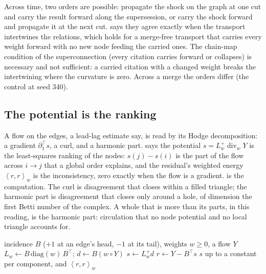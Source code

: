 \documentclass[11pt,a4paper]{article}
\theoremstyle{plain}
\theoremstyle{definition}
\theoremstyle{remark}
\newcommand{\ip}[2]{\left\langle #1, #2 \right\rangle}
\DeclareMathOperator{\divw}{div}
\begin{document}
Across time, two orders are possible: propagate the shock on the graph at one cut and carry the
result forward along the supersession, or carry the shock forward and propagate it at the next
cut.  says they agree exactly when the transport intertwines the relations,
which holds for a merge-free transport that carries every weight forward with no new node feeding
the carried ones. The chain-map condition of the superconnection (every citation carries forward
or collapses) is necessary and not sufficient: a carried citation with a changed weight breaks the
intertwining where the curvature is zero. Across a merge the orders differ (the control at seed
340).

\subsection{The potential is the ranking}

A flow on the edges, a lead-lag estimate say, is read by its Hodge decomposition: a gradient
$\partial_1^{\top}s$, a curl, and a harmonic part.  says the potential
$s = L_w^{+}\divw_w Y$ is the least-squares ranking of the nodes: $s(j) - s(i)$ is the part of
the flow across $i \to j$ that a global order explains, and the residual's weighted energy
$\ip{r}{r}_w$ is the inconsistency, zero exactly when the flow is a gradient. 
is the computation. The curl is disagreement that closes within a filled triangle; the harmonic
part is disagreement that closes only around a hole, of dimension the first Betti number of the
complex. A whole that is more than its parts, in this reading, is the harmonic part: circulation
that no node potential and no local triangle accounts for.

\begin{algorithm}[t]
\caption{HodgeRank: the potential and the inconsistency of a weighted flow.}
\label{alg:hodgerank}
\begin{algorithmic}[1]
\Require incidence $B$ ($+1$ at an edge's head, $-1$ at its tail), weights $w \ge 0$, a flow $Y$
\State $L_w \gets B\,\mathrm{diag}(w)\,B^{\top}$; \quad $d \gets B(w\circ Y)$
\State $s \gets L_w^{+} d$ 
\State $r \gets Y - B^{\top}s$ 
\State \Return $s$ up to a constant per component, and $\ip{r}{r}_w$
\end{algorithmic}
\end{algorithm}
\end{document}
